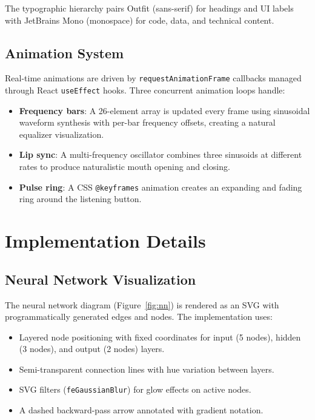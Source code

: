 \documentclass[11pt,a4paper]{article}
\begin{document}
The typographic hierarchy pairs Outfit (sans-serif) for headings and UI labels with JetBrains Mono (monospace) for code, data, and technical content.

\subsection{Animation System}

Real-time animations are driven by \texttt{requestAnimationFrame} callbacks managed through React \texttt{useEffect} hooks. Three concurrent animation loops handle:

\begin{itemize}
  \item \textbf{Frequency bars}: A 26-element array is updated every frame using sinusoidal waveform synthesis with per-bar frequency offsets, creating a natural equalizer visualization.
  \item \textbf{Lip sync}: A multi-frequency oscillator combines three sinusoids at different rates to produce naturalistic mouth opening and closing.
  \item \textbf{Pulse ring}: A CSS \texttt{@keyframes} animation creates an expanding and fading ring around the listening button.
\end{itemize}

\section{Implementation Details}

\subsection{Neural Network Visualization}

The neural network diagram (Figure~\ref{fig:nn}) is rendered as an SVG with programmatically generated edges and nodes. The implementation uses:
\begin{itemize}
  \item Layered node positioning with fixed coordinates for input (5 nodes), hidden (3 nodes), and output (2 nodes) layers.
  \item Semi-transparent connection lines with hue variation between layers.
  \item SVG filters (\texttt{feGaussianBlur}) for glow effects on active nodes.
  \item A dashed backward-pass arrow annotated with gradient notation.
\end{itemize}
\end{document}
